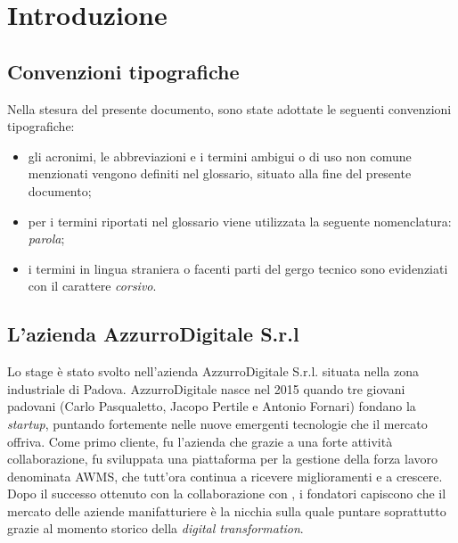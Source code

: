 
\chapter{Introduzione}
\label{cap:introduzione}

\section{Convenzioni tipografiche}
Nella stesura del presente documento, sono state adottate le seguenti convenzioni tipografiche:
\begin{itemize}
	\item gli acronimi, le abbreviazioni e i termini ambigui o di uso non comune menzionati vengono definiti nel glossario, situato alla fine del presente documento;
	\item per i termini riportati nel glossario viene utilizzata la seguente nomenclatura: \emph{parola}\textcolor{SchoolColor}{\ap{[g]}};
	\item i termini in lingua straniera o facenti parti del gergo tecnico sono evidenziati con il carattere \emph{corsivo}.
\end{itemize}




\section{L'azienda AzzurroDigitale S.r.l}

Lo stage è stato svolto nell'azienda AzzurroDigitale S.r.l. situata nella zona industriale di Padova. AzzurroDigitale nasce nel 2015 quando tre giovani padovani (Carlo Pasqualetto, Jacopo Pertile e Antonio Fornari) fondano la \emph{startup}, puntando fortemente nelle nuove emergenti tecnologie che il mercato offriva. Come primo cliente, fu l'azienda  che grazie a una forte attività collaborazione, fu sviluppata una piattaforma per la gestione della forza lavoro denominata \gls{AWMS}, che tutt’ora continua a ricevere miglioramenti e a crescere. Dopo il successo ottenuto con la collaborazione con , i fondatori capiscono che il mercato delle aziende manifatturiere è la nicchia sulla quale puntare soprattutto grazie al momento storico della \emph{digital transformation}. 

